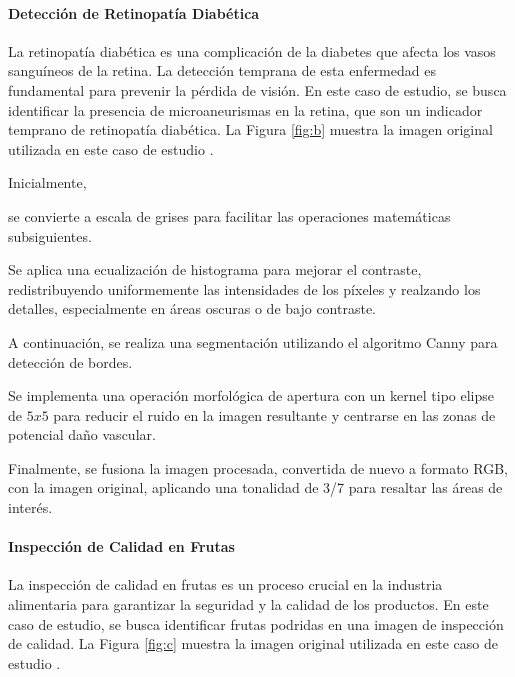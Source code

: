 \paragraph{Detección de Retinopatía Diabética} La retinopatía diabética es una complicación de la diabetes que afecta los vasos sanguíneos de la retina. La detección temprana de esta enfermedad es fundamental para prevenir la pérdida de visión. En este caso de estudio, se busca identificar la presencia de microaneurismas en la retina, que son un indicador temprano de retinopatía diabética. La Figura \ref{fig:b} muestra la imagen original utilizada en este caso de estudio \autocite{DiabeticRetinopathyResized}.

Inicialmente, 
\begin{seriate}
    
    \item se convierte a escala de grises para facilitar las operaciones matemáticas subsiguientes. 
    
    \item Se aplica una ecualización de histograma para mejorar el contraste, redistribuyendo uniformemente las intensidades de los píxeles y realzando los detalles, especialmente en áreas oscuras o de bajo contraste. 
    
    \item A continuación, se realiza una segmentación utilizando el algoritmo Canny para detección de bordes. 
    
    \item Se implementa una operación morfológica de apertura con un kernel tipo elipse de \( 5x5 \) para reducir el ruido en la imagen resultante y centrarse en las zonas de potencial daño vascular. 
    
    \item Finalmente, se fusiona la imagen procesada, convertida de nuevo a formato RGB, con la imagen original, aplicando una tonalidad de 3/7 para resaltar las áreas de interés.
\end{seriate}



\paragraph{Inspección de Calidad en Frutas} La inspección de calidad en frutas es un proceso crucial en la industria alimentaria para garantizar la seguridad y la calidad de los productos. En este caso de estudio, se busca identificar frutas podridas en una imagen de inspección de calidad. La Figura \ref{fig:c} muestra la imagen original utilizada en este caso de estudio \autocite{FruitVegetableDisease}.

